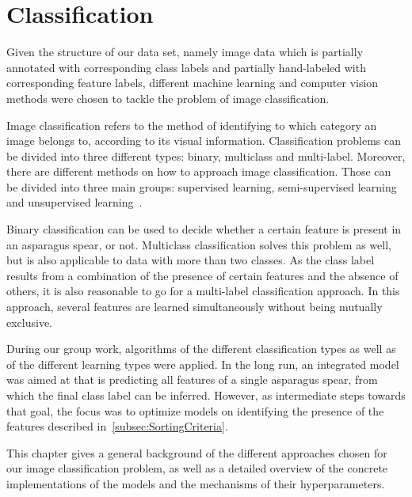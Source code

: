 %
\section{Classification}
\label{ch:Classification}

Given the structure of our data set, namely image data which is partially annotated with corresponding class labels and partially hand-labeled with corresponding feature labels, different machine learning and computer vision methods were chosen to tackle the problem of image classification.

\bigskip
Image classification refers to the method of identifying to which category an image belongs to, according to its visual information. Classification problems can be divided into three different types: binary, multiclass and multi-label. Moreover, there are different methods on how to approach image classification. Those can be divided into three main groups: supervised learning, semi-supervised learning and unsupervised learning~\citep{har2003constraint}. 

Binary classification can be used to decide whether a certain feature is present in an asparagus spear, or not. Multiclass classification solves this problem as well, but is also applicable to data with more than two classes. As the class label results from a combination of the presence of certain features and the absence of others, it is also reasonable to go for a multi-label classification approach. In this approach, several features are learned simultaneously without being mutually exclusive.

During our group work, algorithms of the different classification types as well as of the different learning types were applied.
In the long run, an integrated model was aimed at that is predicting all features of a single asparagus spear, from which the final class label can be inferred. However, as intermediate steps towards that goal, the focus was to optimize models on identifying the presence of the features described in~\autoref{subsec:SortingCriteria}. 

\bigskip
This chapter gives a general background of the different approaches chosen for our image classification problem, as well as a detailed overview of the concrete implementations of the models and the mechanisms of their hyperparameters. 



